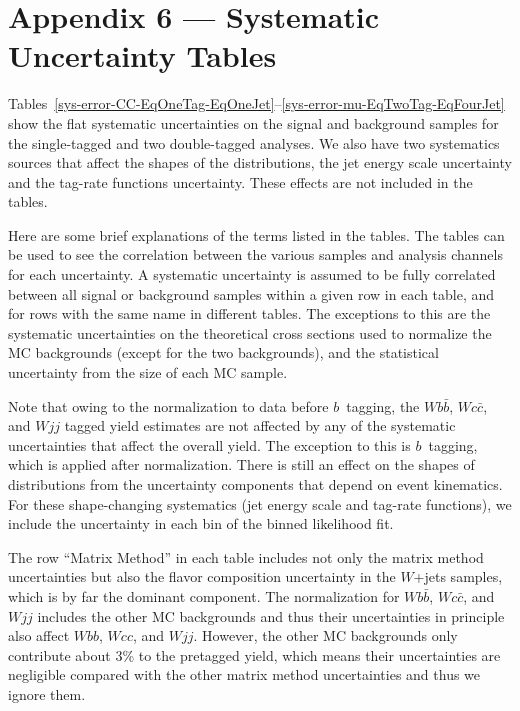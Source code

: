 %
\appendix
\section*{Appendix 6 --- Systematic Uncertainty Tables}
\label{appendix-systematics}


Tables~\ref{sys-error-CC-EqOneTag-EqOneJet}--\ref{sys-error-mu-EqTwoTag-EqFourJet}
show the flat systematic uncertainties on the signal and background
samples for the single-tagged and two double-tagged analyses. We also
have two systematics sources that affect the shapes of the
distributions, the jet energy scale uncertainty and the tag-rate
functions uncertainty. These effects are not included in the tables.

Here are some brief explanations of the terms listed in the
tables. The tables can be used to see the correlation between the
various samples and analysis channels for each uncertainty. A
systematic uncertainty is assumed to be fully correlated between all
signal or background samples within a given row in each table, and for
rows with the same name in different tables. The exceptions to this
are the systematic uncertainties on the theoretical cross sections
used to normalize the MC backgrounds (except for the two {\ttbar}
backgrounds), and the statistical uncertainty from the size of each MC
sample.

Note that owing to the normalization to data before $b$~tagging, the
$Wb\bar{b}$, $Wc\bar{c}$, and $Wjj$ tagged yield estimates are not
affected by any of the systematic uncertainties that affect the
overall yield. The exception to this is $b$~tagging, which is applied
after normalization. There is still an effect on the shapes of
distributions from the uncertainty components that depend on event
kinematics. For these shape-changing systematics (jet energy scale and
tag-rate functions), we include the uncertainty in each bin of the
binned likelihood fit.

The row ``Matrix Method'' in each table includes not only the matrix
method uncertainties but also the flavor composition uncertainty in
the $W$+jets samples, which is by far the dominant component.  The
normalization for $Wb\bar{b}$, $Wc\bar{c}$, and $Wjj$ includes the
other MC backgrounds and thus their uncertainties in principle also
affect $Wbb$, $Wcc$, and $Wjj$.  However, the other MC backgrounds
only contribute about 3\% to the pretagged yield, which means their
uncertainties are negligible compared with the other matrix method
uncertainties and thus we ignore them.

